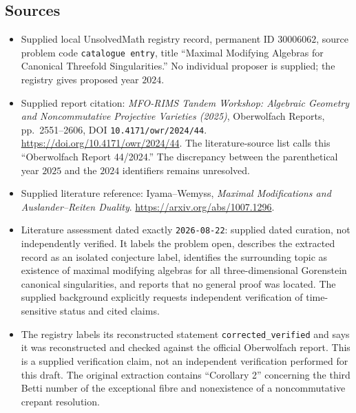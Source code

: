 \documentclass[11pt]{article}
\begin{document}
\subsection{Sources}
\begin{itemize}
\item Supplied local UnsolvedMath registry record, permanent ID \(30006062\), source problem code \texttt{catalogue entry}, title ``Maximal Modifying Algebras for Canonical Threefold Singularities.'' No individual proposer is supplied; the registry gives proposed year \(2024\).
\item Supplied report citation: \emph{MFO-RIMS Tandem Workshop: Algebraic Geometry and Noncommutative Projective Varieties (2025)}, Oberwolfach Reports, pp.\ 2551--2606, DOI \texttt{10.4171/owr/2024/44}. \url{https://doi.org/10.4171/owr/2024/44}. The literature-source list calls this ``Oberwolfach Report 44/2024.'' The discrepancy between the parenthetical year \(2025\) and the \(2024\) identifiers remains unresolved.
\item Supplied literature reference: Iyama--Wemyss, \emph{Maximal Modifications and Auslander--Reiten Duality}. \url{https://arxiv.org/abs/1007.1296}.
\item Literature assessment dated exactly \texttt{2026-08-22}: supplied dated curation, not independently verified. It labels the problem open, describes the extracted record as an isolated conjecture label, identifies the surrounding topic as existence of maximal modifying algebras for all three-dimensional Gorenstein canonical singularities, and reports that no general proof was located. The supplied background explicitly requests independent verification of time-sensitive status and cited claims.
\item The registry labels its reconstructed statement \texttt{corrected\_verified} and says it was reconstructed and checked against the official Oberwolfach report. This is a supplied verification claim, not an independent verification performed for this draft. The original extraction contains ``Corollary 2'' concerning the third Betti number of the exceptional fibre and nonexistence of a noncommutative crepant resolution.
\end{itemize}
\end{document}
